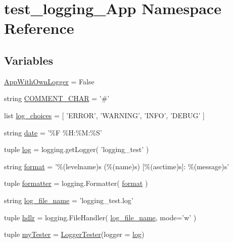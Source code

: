 \section{test\-\_\-logging\-\_\-\-App Namespace Reference}
\label{namespacetest__logging__App}
\subsection*{Variables}
\begin{DoxyCompactItemize}
\item 
\hyperlink{namespacetest__logging__App_ac4657730e1d4f00da86f8ae0a58755ee}{App\-With\-Own\-Logger} = False
\item 
string \hyperlink{namespacetest__logging__App_a7990af3868da1b720d19dae08fb151ee}{C\-O\-M\-M\-E\-N\-T\-\_\-\-C\-H\-A\-R} = '\#'
\item 
list \hyperlink{namespacetest__logging__App_af6aae0be66083e03432f922a877d6e76}{log\-\_\-choices} = \mbox{[} 'E\-R\-R\-O\-R', 'W\-A\-R\-N\-I\-N\-G', 'I\-N\-F\-O', 'D\-E\-B\-U\-G' \mbox{]}
\item 
string \hyperlink{namespacetest__logging__App_ac9e5fdf9ce0d042f17cfcfa62f4f1d9e}{date} = '\%F \%H\-:\%M\-:\%S'
\item 
tuple \hyperlink{namespacetest__logging__App_a5661d99b9ac2ebd5efc47fa7c851410e}{log} = logging.\-get\-Logger( 'logging\-\_\-test' )
\item 
string \hyperlink{namespacetest__logging__App_a98e4a4b1eaf638f7b38229336efaac0a}{format} = '\%(levelname)s (\%(name)s) \mbox{[}\%(asctime)s\mbox{]}\-: \%(message)s'
\item 
tuple \hyperlink{namespacetest__logging__App_aab261ad66d0b9deb3ded5b012f19b218}{formatter} = logging.\-Formatter( \hyperlink{namespacetest__logging__App_a98e4a4b1eaf638f7b38229336efaac0a}{format} )
\item 
string \hyperlink{namespacetest__logging__App_aed9c64e956bc04064d38fc2d1bf77201}{log\-\_\-file\-\_\-name} = 'logging\-\_\-test.\-log'
\item 
tuple \hyperlink{namespacetest__logging__App_ab4a8f9d05288bd9c810bc3b3863167ae}{hdlr} = logging.\-File\-Handler( \hyperlink{namespacetest__logging__App_aed9c64e956bc04064d38fc2d1bf77201}{log\-\_\-file\-\_\-name}, mode='w' )
\item 
tuple \hyperlink{namespacetest__logging__App_afaeeba25074786a02ffb0098ab24315d}{my\-Tester} = \hyperlink{classtest__logging__lib_1_1LoggerTester}{Logger\-Tester}(logger = \hyperlink{namespacetest__logging__App_a5661d99b9ac2ebd5efc47fa7c851410e}{log})
\end{DoxyCompactItemize}


